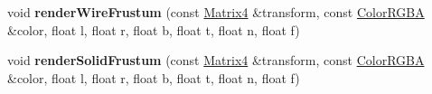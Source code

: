 \begin{DoxyCompactItemize}
\item 
void {\bfseries render\+Wire\+Frustum} (const \hyperlink{class_i_dream_sky_1_1_matrix4}{Matrix4} \&transform, const \hyperlink{class_i_dream_sky_1_1_color_r_g_b_a}{Color\+R\+G\+BA} \&color, float l, float r, float b, float t, float n, float f)\hypertarget{class_i_dream_sky_1_1_i_component_debug_renderer_a2dd362fd9082054572fd3e562e251582}{}\label{class_i_dream_sky_1_1_i_component_debug_renderer_a2dd362fd9082054572fd3e562e251582}

\item 
void {\bfseries render\+Solid\+Frustum} (const \hyperlink{class_i_dream_sky_1_1_matrix4}{Matrix4} \&transform, const \hyperlink{class_i_dream_sky_1_1_color_r_g_b_a}{Color\+R\+G\+BA} \&color, float l, float r, float b, float t, float n, float f)\hypertarget{class_i_dream_sky_1_1_i_component_debug_renderer_ac08a39573a0b7f8a29d526476d6fe4b5}{}\label{class_i_dream_sky_1_1_i_component_debug_renderer_ac08a39573a0b7f8a29d526476d6fe4b5}

\end{DoxyCompactItemize}
